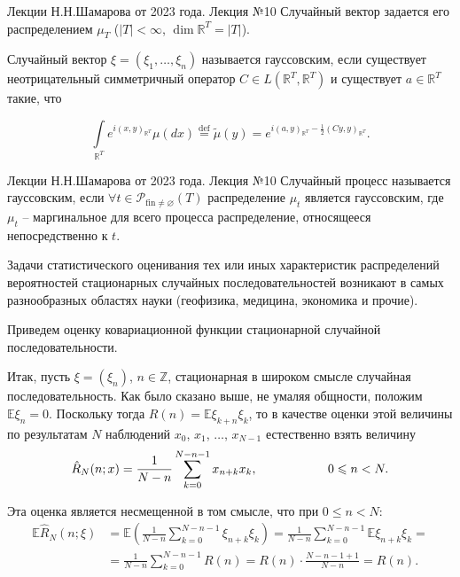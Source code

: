 	
		\begin{Definition}{Лекции Н.Н.Шамарова от 2023 года. Лекция №10}
			Случайный вектор задается его распределением $\mu_T$ ($|T| < \infty$, $\dim\mathbb{R}^T = |T|$).
			
			Случайный вектор $\xi = (\xi_1, \ldots, \xi_n)$ называется гауссовским, если существует неотрицательный симметричный оператор $C \in L(\mathbb{R}^T, \mathbb{R}^T)$ и существует $a \in \mathbb{R}^T$ такие, что
			
			\begin{equation*}
				\int\limits_{\mathbb{R}^T} e^{i(x,y)_{\mathbb{R}^T}} \mu(dx) \stackrel{\text{def}}{=} \widetilde{\mu}(y) = e^{i(a,y)_{\mathbb{R}^T} - \frac{1}{2}(Cy, y)_{\mathbb{R}^T}}.
			\end{equation*}
		\end{Definition}
	
		\begin{Definition}{Лекции Н.Н.Шамарова от 2023 года. Лекция №10}
			Случайный процесс называется гауссовским, если $\forall t \in \mathscr{P}_{\text{fin} \neq \varnothing}(T)$ распределение $\mu_t$ является гауссовским, где $\mu_t$ -- маргинальное для всего процесса распределение, относящееся непосредственно к $t$.
		\end{Definition}

		Задачи статистического оценивания тех или иных характеристик распределений вероятностей стационарных случайных последовательностей возникают в самых разнообразных областях науки (геофизика, медицина, экономика и прочие). 
		
		Приведем оценку ковариационной функции стационарной случайной последовательности.
		
		Итак, пусть $\xi = (\xi_n)$, $n \in \mathbb{Z}$, стационарная в широком смысле случайная последовательность. Как было сказано выше, не умаляя общности, положим $\mathbb{E}\xi_n = 0$. Поскольку тогда $R(n) = \mathbb{E}\xi_{k + n}\xi_k$, то в качестве оценки этой величины по результатам $N$ наблюдений $x_0$, $x_1$, $\ldots$, $x_{N-1}$ естественно взять величину
		\begin{equation*}
			\hat{R}_N(n; x) = \frac{1}{N - n}\sum\limits_{k = 0}^{N - n - 1} x_{n+k} x_k, \hspace{20mm} 0 \leqslant n < N.
		\end{equation*}
	
		Эта оценка является несмещенной в том смысле, что при $0 \leqslant n < N$:
		\begin{equation*}
			\begin{split}
			\mathbb{E} \hat{R}_N(n; \xi) & = \mathbb{E}\left(\frac{1}{N-n}\sum\limits_{k = 0}^{N - n - 1} \xi_{n+k} \xi_k\right) = \frac{1}{N-n}\sum\limits_{k = 0}^{N - n - 1} \mathbb{E} \xi_{n+k} \xi_k = \\
			& = \frac{1}{N-n}\sum\limits_{k = 0}^{N-n-1}R(n) = R(n) \cdot \frac{N-n-1 + 1}{N-n} = R(n).
			\end{split}
		\end{equation*}
	
